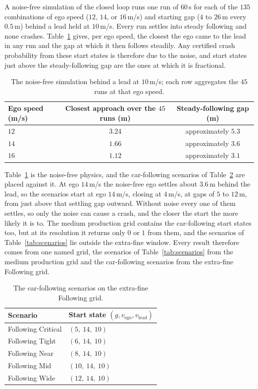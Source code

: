 \documentclass[11pt,a4paper]{article}
\newcommand{\vego}{v_{\text{ego}}}
\newcommand{\vlead}{v_{\text{lead}}}
\theoremstyle{plain}
\theoremstyle{remark}
\begin{document}
	A noise-free simulation of the closed loop runs one run of $60$\,s for each of the $135$ combinations of ego speed ($12$, $14$, or $16$\,m/s) and starting gap ($4$ to $26$\,m every $0.5$\,m) behind a lead held at $10$\,m/s. Every run settles into steady following and none crashes. Table~\ref{tab:settle} gives, per ego speed, the closest the ego came to the lead in any run and the gap at which it then follows steadily. Any certified crash probability from these start states is therefore due to the noise, and start states just above the steady-following gap are the ones at which it is fractional.
	
	\begin{table}[H]
		\centering
		\begin{tabular}{lcc}
			\toprule
			Ego speed (m/s) & Closest approach over the $45$ runs (m) & Steady-following gap (m) \\
			\midrule
			$12$ & $3.24$ & approximately $5.3$ \\
			$14$ & $1.66$ & approximately $3.6$ \\
			$16$ & $1.12$ & approximately $3.1$ \\
			\bottomrule
		\end{tabular}
		\caption{The noise-free simulation behind a lead at $10$\,m/s; each row aggregates the $45$ runs at that ego speed.}
		\label{tab:settle}
	\end{table}
	
	Table~\ref{tab:settle} is the noise-free physics, and the car-following scenarios of Table~\ref{tab:following} are placed against it. At ego $14$\,m/s the noise-free ego settles about $3.6$\,m behind the lead, so the scenarios start at ego $14$\,m/s, closing at $4$\,m/s, at gaps of $5$ to $12$\,m, from just above that settling gap outward. Without noise every one of them settles, so only the noise can cause a crash, and the closer the start the more likely it is to. The medium production grid contains the car-following start states too, but at its resolution it returns only $0$ or $1$ from them, and the scenarios of Table~\ref{tab:scenarios} lie outside the extra-fine window. Every result therefore comes from one named grid, the scenarios of Table~\ref{tab:scenarios} from the medium production grid and the car-following scenarios from the extra-fine Following grid.
	
	\begin{table}[H]
		\centering
		\begin{tabular}{ll}
			\toprule
			Scenario & Start state $(g, \vego, \vlead)$ \\
			\midrule
			Following Critical & $(5,\ 14,\ 10)$ \\
			Following Tight & $(6,\ 14,\ 10)$ \\
			Following Near & $(8,\ 14,\ 10)$ \\
			Following Mid & $(10,\ 14,\ 10)$ \\
			Following Wide & $(12,\ 14,\ 10)$ \\
			\bottomrule
		\end{tabular}
		\caption{The car-following scenarios on the extra-fine Following grid.}
		\label{tab:following}
	\end{table}
	
\end{document}
